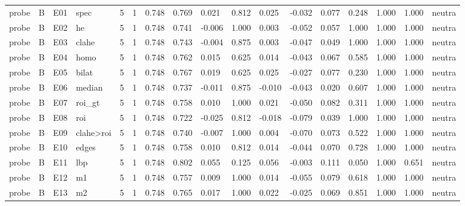 \begin{table}[ht]
\begin{tabular}{lllllllllllllllll}
probe & B & E01 & spec & 5 & 1 & 0.748 & 0.769 & 0.021 & 0.812 & 0.025 & -0.032 & 0.077 & 0.248 & 1.000 & 1.000 & neutra \\
probe & B & E02 & he & 5 & 1 & 0.748 & 0.741 & -0.006 & 1.000 & 0.003 & -0.052 & 0.057 & 1.000 & 1.000 & 1.000 & neutra \\
probe & B & E03 & clahe & 5 & 1 & 0.748 & 0.743 & -0.004 & 0.875 & 0.003 & -0.047 & 0.049 & 1.000 & 1.000 & 1.000 & neutra \\
probe & B & E04 & homo & 5 & 1 & 0.748 & 0.762 & 0.015 & 0.625 & 0.014 & -0.043 & 0.067 & 0.585 & 1.000 & 1.000 & neutra \\
probe & B & E05 & bilat & 5 & 1 & 0.748 & 0.767 & 0.019 & 0.625 & 0.025 & -0.027 & 0.077 & 0.230 & 1.000 & 1.000 & neutra \\
probe & B & E06 & median & 5 & 1 & 0.748 & 0.737 & -0.011 & 0.875 & -0.010 & -0.043 & 0.020 & 0.607 & 1.000 & 1.000 & neutra \\
probe & B & E07 & roi\_gt & 5 & 1 & 0.748 & 0.758 & 0.010 & 1.000 & 0.021 & -0.050 & 0.082 & 0.311 & 1.000 & 1.000 & neutra \\
probe & B & E08 & roi & 5 & 1 & 0.748 & 0.722 & -0.025 & 0.812 & -0.018 & -0.079 & 0.039 & 1.000 & 1.000 & 1.000 & neutra \\
probe & B & E09 & clahe>roi & 5 & 1 & 0.748 & 0.740 & -0.007 & 1.000 & 0.004 & -0.070 & 0.073 & 0.522 & 1.000 & 1.000 & neutra \\
probe & B & E10 & edges & 5 & 1 & 0.748 & 0.758 & 0.010 & 0.812 & 0.014 & -0.044 & 0.070 & 0.728 & 1.000 & 1.000 & neutra \\
probe & B & E11 & lbp & 5 & 1 & 0.748 & 0.802 & 0.055 & 0.125 & 0.056 & -0.003 & 0.111 & 0.050 & 1.000 & 0.651 & neutra \\
probe & B & E12 & m1 & 5 & 1 & 0.748 & 0.757 & 0.009 & 1.000 & 0.014 & -0.055 & 0.079 & 0.618 & 1.000 & 1.000 & neutra \\
probe & B & E13 & m2 & 5 & 1 & 0.748 & 0.765 & 0.017 & 1.000 & 0.022 & -0.025 & 0.069 & 0.851 & 1.000 & 1.000 & neutra \\
\bottomrule
\end{tabular}
\end{table}